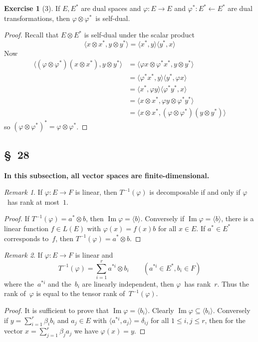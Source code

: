 \documentclass[letterpaper,12pt]{article}
\newcommand{\from}{\leftarrow}
\DeclareMathOperator{\im}{Im}
\newcommand{\tprod}{\otimes}
\newcommand{\gen}[1]{\langle#1\rangle}
\newcommand{\sprod}[2]{\langle#1,#2\rangle}
\theoremstyle{definition}
\newtheorem*{exer}{Exercise}
\theoremstyle{remark}
\newtheorem*{rmk}{Remark}
\begin{document}
\begin{exer}[3]
If \(E,E^*\) are dual spaces and \(\varphi:E\to E\) and \(\varphi^*:E^*\from E^*\) are dual transformations, then \(\varphi\tprod\varphi^*\)~is self-dual.
\end{exer}
\begin{proof}
Recall that \(E\tprod E^*\) is self-dual under the scalar product
\[\sprod{x\tprod x^*}{y\tprod y^*}=\sprod{x^*}{y}\sprod{y^*}{x}\]
Now
\begin{align*}
\sprod{(\varphi\tprod\varphi^*)(x\tprod x^*)}{y\tprod y^*}&=\sprod{\varphi x\tprod\varphi^* x^*}{y\tprod y^*}\\
	&=\sprod{\varphi^* x^*}{y}\sprod{y^*}{\varphi x}\\
	&=\sprod{x^*}{\varphi y}\sprod{\varphi^* y^*}{x}\\
	&=\sprod{x\tprod x^*}{\varphi y\tprod\varphi^* y^*}\\
	&=\sprod{x\tprod x^*}{(\varphi\tprod\varphi^*)(y\tprod y^*)}
\end{align*}
so \((\varphi\tprod\varphi^*)^*=\varphi\tprod\varphi^*\).
\end{proof}

\subsection*{\S~28}
\textbf{In this subsection, all vector spaces are finite-dimensional.}

\begin{rmk}
If \(\varphi:E\to F\) is linear, then \(T^{-1}(\varphi)\) is decomposable if and only if \(\varphi\)~has rank at most~\(1\).
\end{rmk}
\begin{proof}
If \(T^{-1}(\varphi)=a^*\tprod b\), then \(\im\varphi=\gen{b}\). Conversely if \(\im\varphi=\gen{b}\), there is a linear function \(f\in L(E)\) with \(\varphi(x)=f(x)b\) for all \(x\in E\). If \(a^*\in E^*\) corresponds to~\(f\), then \(T^{-1}(\varphi)=a^*\tprod b\).
\end{proof}

\begin{rmk}
If \(\varphi:E\to F\) is linear and
\[T^{-1}(\varphi)=\sum_{i=1}^r a^{*i}\tprod b_i\qquad(a^{*i}\in E^*,b_i\in F)\]
where the~\(a^{*i}\) and the~\(b_i\) are linearly independent, then \(\varphi\)~has rank~\(r\). Thus the rank of~\(\varphi\) is equal to the tensor rank of~\(T^{-1}(\varphi)\).
\end{rmk}
\begin{proof}
It is sufficient to prove that \(\im\varphi=\gen{b_i}\). Clearly \(\im\varphi\subseteq\gen{b_i}\). Conversely if \(y=\sum_{i=1}^r\beta_ib_i\) and \(a_j\in E\) with \(\sprod{a^{*i}}{a_j}=\delta_{ij}\) for all \(1\le i,j\le r\), then for the vector \(x=\sum_{j=1}^r\beta_j a_j\) we have \(\varphi(x)=y\).
\end{proof}
\end{document}

